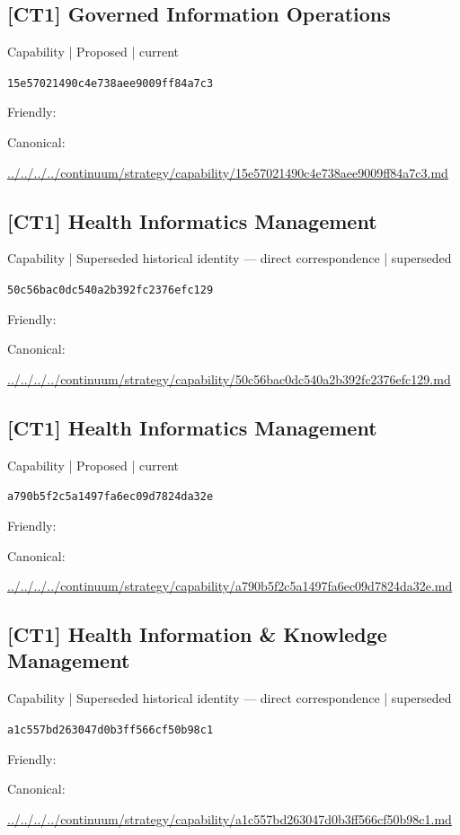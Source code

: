 \documentclass[10pt,a4paper]{article}
\begin{document}
\subsection*{[CT1] Governed Information Operations}
{\small Capability | Proposed | current}\par
\texttt{15e57021490c4e738aee9009ff84a7c3}\par
Friendly: \par
Canonical: \par
{\footnotesize\url{../../../../continuum/strategy/capability/15e57021490c4e738aee9009ff84a7c3.md}}\par
\subsection*{[CT1] Health Informatics Management}
{\small Capability | Superseded historical identity — direct correspondence | superseded}\par
\texttt{50c56bac0dc540a2b392fc2376efc129}\par
Friendly: \par
Canonical: \par
{\footnotesize\url{../../../../continuum/strategy/capability/50c56bac0dc540a2b392fc2376efc129.md}}\par
\subsection*{[CT1] Health Informatics Management}
{\small Capability | Proposed | current}\par
\texttt{a790b5f2c5a1497fa6ec09d7824da32e}\par
Friendly: \par
Canonical: \par
{\footnotesize\url{../../../../continuum/strategy/capability/a790b5f2c5a1497fa6ec09d7824da32e.md}}\par
\subsection*{[CT1] Health Information \& Knowledge Management}
{\small Capability | Superseded historical identity — direct correspondence | superseded}\par
\texttt{a1c557bd263047d0b3ff566cf50b98c1}\par
Friendly: \par
Canonical: \par
{\footnotesize\url{../../../../continuum/strategy/capability/a1c557bd263047d0b3ff566cf50b98c1.md}}\par
\end{document}
